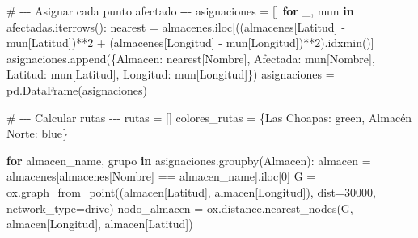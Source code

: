 \documentclass[
  spanish,
  us-letterpaper,
]{scrreprt}
\newenvironment{Shaded}{\begin{snugshade}}{\end{snugshade}}
\newcommand{\CommentTok}[1]{\textcolor[rgb]{0.37,0.37,0.37}{#1}}
\newcommand{\ControlFlowTok}[1]{\textcolor[rgb]{0.00,0.23,0.31}{\textbf{#1}}}
\newcommand{\DecValTok}[1]{\textcolor[rgb]{0.68,0.00,0.00}{#1}}
\newcommand{\KeywordTok}[1]{\textcolor[rgb]{0.00,0.23,0.31}{\textbf{#1}}}
\newcommand{\NormalTok}[1]{\textcolor[rgb]{0.00,0.23,0.31}{#1}}
\newcommand{\OperatorTok}[1]{\textcolor[rgb]{0.37,0.37,0.37}{#1}}
\newcommand{\StringTok}[1]{\textcolor[rgb]{0.13,0.47,0.30}{#1}}
\numberwithin{equation}{section}
\begin{document}
\begin{Shaded}
\begin{Highlighting}[]
\CommentTok{\# {-}{-}{-} Asignar cada punto afectado {-}{-}{-}}
\NormalTok{asignaciones }\OperatorTok{=}\NormalTok{ []}
\ControlFlowTok{for}\NormalTok{ \_, mun }\KeywordTok{in}\NormalTok{ afectadas.iterrows():}
\NormalTok{    nearest }\OperatorTok{=}\NormalTok{ almacenes.iloc[((almacenes[}\StringTok{\textquotesingle{}Latitud\textquotesingle{}}\NormalTok{] }\OperatorTok{{-}}
\NormalTok{     mun[}\StringTok{\textquotesingle{}Latitud\textquotesingle{}}\NormalTok{])}\OperatorTok{**}\DecValTok{2} \OperatorTok{+}\NormalTok{ (almacenes[}\StringTok{\textquotesingle{}Longitud\textquotesingle{}}\NormalTok{] }\OperatorTok{{-}} 
\NormalTok{     mun[}\StringTok{\textquotesingle{}Longitud\textquotesingle{}}\NormalTok{])}\OperatorTok{**}\DecValTok{2}\NormalTok{).idxmin()]}
\NormalTok{    asignaciones.append(\{}\StringTok{\textquotesingle{}Almacen\textquotesingle{}}\NormalTok{: nearest[}\StringTok{\textquotesingle{}Nombre\textquotesingle{}}\NormalTok{],}
     \StringTok{\textquotesingle{}Afectada\textquotesingle{}}\NormalTok{: mun[}\StringTok{\textquotesingle{}Nombre\textquotesingle{}}\NormalTok{], }\StringTok{\textquotesingle{}Latitud\textquotesingle{}}\NormalTok{: mun[}\StringTok{\textquotesingle{}Latitud\textquotesingle{}}\NormalTok{],}
      \StringTok{\textquotesingle{}Longitud\textquotesingle{}}\NormalTok{: mun[}\StringTok{\textquotesingle{}Longitud\textquotesingle{}}\NormalTok{]\})}
\NormalTok{asignaciones }\OperatorTok{=}\NormalTok{ pd.DataFrame(asignaciones)}

\CommentTok{\# {-}{-}{-} Calcular rutas {-}{-}{-}}
\NormalTok{rutas }\OperatorTok{=}\NormalTok{ []}
\NormalTok{colores\_rutas }\OperatorTok{=}\NormalTok{ \{}\StringTok{\textquotesingle{}Las Choapas\textquotesingle{}}\NormalTok{: }\StringTok{\textquotesingle{}green\textquotesingle{}}\NormalTok{, }\StringTok{\textquotesingle{}Almacén Norte\textquotesingle{}}\NormalTok{: }\StringTok{\textquotesingle{}blue\textquotesingle{}}\NormalTok{\}}

\ControlFlowTok{for}\NormalTok{ almacen\_name, grupo }\KeywordTok{in}\NormalTok{ asignaciones.groupby(}\StringTok{\textquotesingle{}Almacen\textquotesingle{}}\NormalTok{):}
\NormalTok{    almacen }\OperatorTok{=}\NormalTok{ almacenes[almacenes[}\StringTok{\textquotesingle{}Nombre\textquotesingle{}}\NormalTok{] }\OperatorTok{==}\NormalTok{ almacen\_name].iloc[}\DecValTok{0}\NormalTok{]}
\NormalTok{    G }\OperatorTok{=}\NormalTok{ ox.graph\_from\_point((almacen[}\StringTok{\textquotesingle{}Latitud\textquotesingle{}}\NormalTok{], almacen[}\StringTok{\textquotesingle{}Longitud\textquotesingle{}}\NormalTok{]),}
\NormalTok{     dist}\OperatorTok{=}\DecValTok{30000}\NormalTok{, network\_type}\OperatorTok{=}\StringTok{\textquotesingle{}drive\textquotesingle{}}\NormalTok{)}
\NormalTok{    nodo\_almacen }\OperatorTok{=}\NormalTok{ ox.distance.nearest\_nodes(G,}
\NormalTok{     almacen[}\StringTok{\textquotesingle{}Longitud\textquotesingle{}}\NormalTok{], almacen[}\StringTok{\textquotesingle{}Latitud\textquotesingle{}}\NormalTok{])}


\end{Highlighting}
\end{Shaded}
\end{document}
